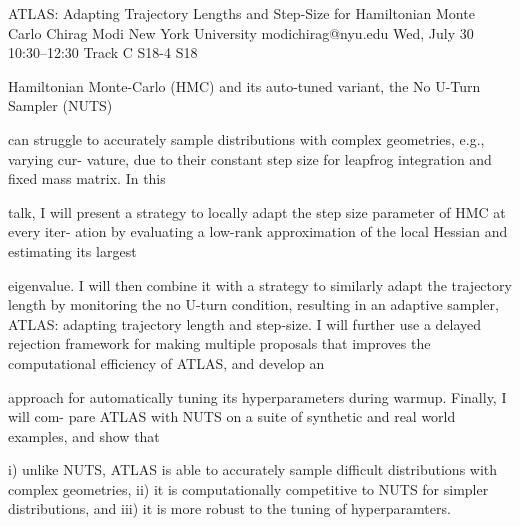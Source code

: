 \begin{talk}
  {ATLAS: Adapting Trajectory Lengths and Step-Size for Hamiltonian Monte Carlo}%
  {Chirag Modi}%
  {New York University}%
  {modichirag@nyu.edu}%
  {}%
  {}%
  {Wed, July 30 10:30–12:30 Track C}%
  {S18-4}%
  {S18}%
  {}%
  
				

Hamiltonian Monte-Carlo (HMC) and its auto-tuned variant, the No U-Turn Sampler (NUTS)

can struggle to accurately sample distributions with complex geometries, e.g., varying cur-
vature, due to their constant step size for leapfrog integration and fixed mass matrix. In this

talk, I will present a strategy to locally adapt the step size parameter of HMC at every iter-
ation by evaluating a low-rank approximation of the local Hessian and estimating its largest

eigenvalue. I will then combine it with a strategy to similarly adapt the trajectory length
by monitoring the no U-turn condition, resulting in an adaptive sampler, ATLAS: adapting
trajectory length and step-size. I will further use a delayed rejection framework for making
multiple proposals that improves the computational efficiency of ATLAS, and develop an

approach for automatically tuning its hyperparameters during warmup. Finally, I will com-
pare ATLAS with NUTS on a suite of synthetic and real world examples, and show that

i) unlike NUTS, ATLAS is able to accurately sample difficult distributions with complex
geometries, ii) it is computationally competitive to NUTS for simpler distributions, and iii)
it is more robust to the tuning of hyperparamters.
\medskip

\end{talk}

